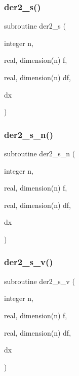 \mbox{\label{ders__n_8f_a4e34fb09ff930f5b2a193bbfe2cc449b}} 
\subsubsection{\texorpdfstring{der2\+\_\+s()}{der2\_s()}}
{\footnotesize\ttfamily subroutine der2\+\_\+s (\begin{DoxyParamCaption}\item[{integer}]{n,  }\item[{real, dimension(n)}]{f,  }\item[{real, dimension(n)}]{df,  }\item[{}]{dx }\end{DoxyParamCaption})}

\mbox{\label{ders__n_8f_ac9979f83add01ba34e1e3a3aa9d1c688}} 
\subsubsection{\texorpdfstring{der2\+\_\+s\+\_\+n()}{der2\_s\_n()}}
{\footnotesize\ttfamily subroutine der2\+\_\+s\+\_\+n (\begin{DoxyParamCaption}\item[{integer}]{n,  }\item[{real, dimension(n)}]{f,  }\item[{real, dimension(n)}]{df,  }\item[{}]{dx }\end{DoxyParamCaption})}

\mbox{\label{ders__n_8f_a31ff8b26a5357b1b52ae71e4f7106a3b}} 
\subsubsection{\texorpdfstring{der2\+\_\+s\+\_\+v()}{der2\_s\_v()}}
{\footnotesize\ttfamily subroutine der2\+\_\+s\+\_\+v (\begin{DoxyParamCaption}\item[{integer}]{n,  }\item[{real, dimension(n)}]{f,  }\item[{real, dimension(n)}]{df,  }\item[{}]{dx }\end{DoxyParamCaption})}

